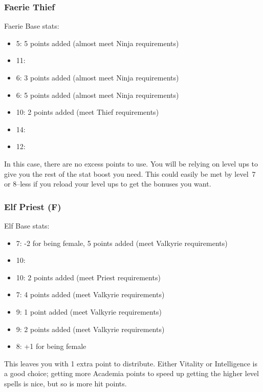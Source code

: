 \documentclass[12pt]{article}
\providecommand{\tightlist}{%
  \setlength{\itemsep}{0pt}\setlength{\parskip}{0pt}}
\begin{document}
\subsubsection{Faerie Thief}
\label{sec:faerie-thief}

Faerie Base stats:

\begin{itemize}
\tightlist
\item
  5: 5 points added (almost meet Ninja requirements)
\item
  11:
\item
  6: 3 points added (almost meet Ninja requirements)
\item
  6: 5 points added (almost meet Ninja requirements)
\item
  10: 2 points added (meet Thief requirements)
\item
  14:
\item
  12:
\end{itemize}

In this case, there are no excess points to use. You will be relying on
level ups to give you the rest of the stat boost you need. This could
easily be met by level~7 or 8--less if you reload your level ups to get
the bonuses you want.

\subsubsection{Elf Priest (F)}
\label{sec:elf-priest-f}

Elf Base stats:

\begin{itemize}
\tightlist
\item
  7: -2 for being female, 5 points added (meet Valkyrie requirements)
\item
  10:
\item
  10: 2 points added (meet Priest requirements)
\item
  7: 4 points added (meet Valkyrie requirements)
\item
  9: 1 point added (meet Valkyrie requirements)
\item
  9: 2 points added (meet Valkyrie requirements)
\item
  8: +1 for being female
\end{itemize}

This leaves you with 1 extra point to distribute. Either Vitality or
Intelligence is a good choice; getting more Academia points to speed up
getting the higher level spells is nice, but so is more hit points.
\end{document}
